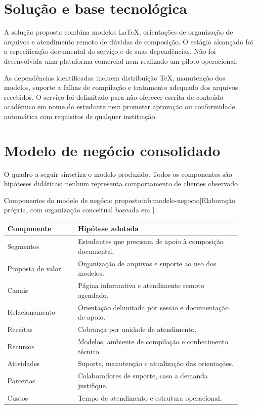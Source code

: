 \chapter{Solução e base tecnológica}
A solução proposta combina modelos LaTeX, orientações de organização de
arquivos e atendimento remoto de dúvidas de composição. O estágio alcançado
foi a especificação documental do serviço e de suas dependências. Não foi
desenvolvida uma plataforma comercial nem realizado um piloto operacional.

As dependências identificadas incluem distribuição TeX, manutenção dos modelos,
suporte a falhas de compilação e tratamento adequado dos arquivos recebidos.
O serviço foi delimitado para não oferecer escrita de conteúdo acadêmico
em nome do estudante nem prometer aprovação ou conformidade automática
com requisitos de qualquer instituição.

\chapter{Modelo de negócio consolidado}
O quadro a seguir sintetiza o modelo produzido. Todos os componentes são
hipóteses didáticas; nenhum representa comportamento de clientes observado.

\begin{undftabela}[H]{Componentes do modelo de negócio proposto}{tab:modelo-negocio}[Elaboração própria, com organização conceitual baseada em ]
\begin{tabular}{@{}p{0.29\linewidth}p{0.65\linewidth}@{}}
\hline
\textbf{Componente} & \textbf{Hipótese adotada} \\
\hline
Segmentos & Estudantes que precisam de apoio à composição documental. \\
Proposta de valor & Organização de arquivos e suporte ao uso dos modelos. \\
Canais & Página informativa e atendimento remoto agendado. \\
Relacionamento & Orientação delimitada por sessão e documentação de apoio. \\
Receitas & Cobrança por unidade de atendimento. \\
Recursos & Modelos, ambiente de compilação e conhecimento técnico. \\
Atividades & Suporte, manutenção e atualização das orientações. \\
Parcerias & Colaboradores de suporte, caso a demanda justifique. \\
Custos & Tempo de atendimento e estrutura operacional. \\
\hline
\end{tabular}
\end{undftabela}

